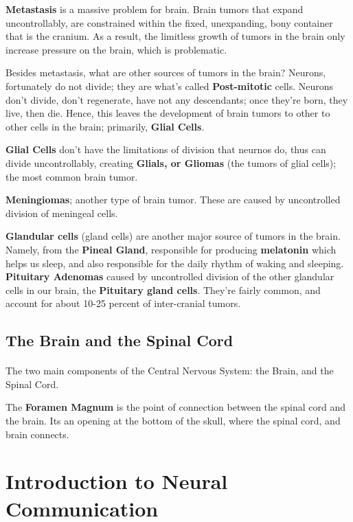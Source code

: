 \documentclass[12pt, a4paper]{article}
\begin{document}
\textbf{Metastasis} is a massive problem for brain. Brain tumors that expand 
uncontrollably, are constrained within the fixed, unexpanding, bony container that is the cranium.
As a result, the limitless growth of tumors in the brain only increase pressure on the brain, which is problematic.

Besides metastasis, what are other sources of tumors in the brain? Neurons, fortunately
do not divide; they are what's called \textbf{Post-mitotic} cells. Neurons don't divide,
don't regenerate, have not any descendants; once they're born, they live, then die. Hence,
this leaves the development of brain tumors to other to other cells in the brain; primarily,
\textbf{Glial Cells}.

\textbf{Glial Cells} don't have the limitations of division that neurnos do, thus
can divide uncontrollably, creating \textbf{Glials, or Gliomas} (the tumors of glial cells); the
most common brain tumor.

\textbf{Meningiomas}; another type of brain tumor. These are caused by uncontrolled division of 
meningeal cells.

\textbf{Glandular cells} (gland cells) are another major source of tumors in the brain.
Namely, from the  \textbf{Pineal Gland}, responsible for producing \textbf{melatonin}
which helps us sleep, and also responsible for the daily rhythm of waking and sleeping.
\textbf{Pituitary Adenomas} caused by uncontrolled division of the other glandular cells in our brain,
the \textbf{Pituitary gland cells}. They're fairly common, and account for about 10-25 percent
of inter-cranial tumors.

\subsection{The Brain and the Spinal Cord}
\paragraph*{}
The two main components of the Central Nervous System: the Brain, and the Spinal Cord.

The \textbf{Foramen Magnum} is the point of connection between the spinal cord and the brain. Its an opening at the bottom of the skull,
where the spinal cord, and brain connects.

\newpage

\section{Introduction to Neural Communication}
\end{document}
